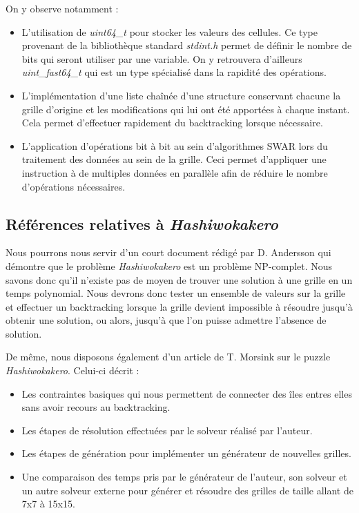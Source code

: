 \documentclass[12pt]{article}
\begin{document}
On y observe notamment :
\begin{itemize}
\item L'utilisation de \textit{uint64\_t} pour stocker les valeurs des cellules. Ce type provenant de la bibliothèque standard \textit{stdint.h} permet de définir le nombre de bits qui seront utiliser par une variable. On y retrouvera d'ailleurs \textit{uint\_fast64\_t} qui est un type spécialisé dans la rapidité des opérations.
\item L'implémentation d'une liste chaînée d'une structure conservant chacune la grille d'origine et les modifications qui lui ont été apportées à chaque instant. Cela permet d'effectuer rapidement du backtracking lorsque nécessaire.
\item L'application d'opérations bit à bit au sein d'algorithmes SWAR lors du traitement des données au sein de la grille. Ceci permet d'appliquer une instruction à de multiples données en parallèle afin de réduire le nombre d'opérations nécessaires.\\
\end{itemize}

\subsection{Références relatives à \textit{Hashiwokakero}}
Nous pourrons nous servir d'un court document rédigé par D. Andersson \cite{andersson2009hashiwokakero} qui démontre que le problème \textit{Hashiwokakero} est un problème NP-complet. Nous savons donc qu'il n'existe pas de moyen de trouver une solution à une grille en un temps polynomial. Nous devrons donc tester un ensemble de valeurs sur la grille et effectuer un backtracking lorsque la grille devient impossible à résoudre jusqu'à obtenir une solution, ou alors, jusqu'à que l'on puisse admettre l'absence de solution.\\

\newpage

De même, nous disposons également d'un article de T. Morsink \cite{hashiwokakero2009available} sur le puzzle \textit{Hashiwokakero}. Celui-ci décrit :
\begin{itemize}
\item Les contraintes basiques qui nous permettent de connecter des îles entres elles sans avoir recours au backtracking.
\item Les étapes de résolution effectuées par le solveur réalisé par l'auteur.
\item Les étapes de génération pour implémenter un générateur de nouvelles grilles.
\item Une comparaison des temps pris par le générateur de l'auteur, son solveur et un autre solveur externe pour générer et résoudre des grilles de taille allant de 7x7 à 15x15.\\
\end{itemize}
\end{document}
